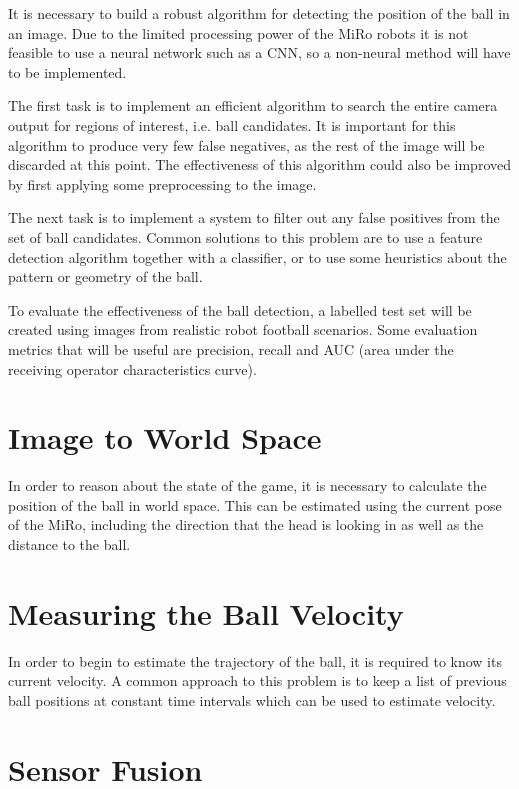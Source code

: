 It is necessary to build a robust algorithm for detecting the position of the ball in an image. Due to the limited processing power of the MiRo robots it is not feasible to use a neural network such as a CNN, so a non-neural method will have to be implemented.

The first task is to implement an efficient algorithm to search the entire camera output for regions of interest, i.e. ball candidates. It is important for this algorithm to produce very few false negatives, as the rest of the image will be discarded at this point. The effectiveness of this algorithm could also be improved by first applying some preprocessing to the image. 

The next task is to implement a system to filter out any false positives from the set of ball candidates. Common solutions to this problem are to use a feature detection algorithm together with a classifier, or to use some heuristics about the pattern or geometry of the ball. 

To evaluate the effectiveness of the ball detection, a labelled test set will be created using images from realistic robot football scenarios. Some evaluation metrics that will be useful are precision, recall and AUC (area under the receiving operator characteristics curve). 

\section{Image to World Space}

In order to reason about the state of the game, it is necessary to calculate the position of the ball in world space. This can be estimated using the current pose of the MiRo, including the direction that the head is looking in as well as the distance to the ball. 

\section{Measuring the Ball Velocity}

In order to begin to estimate the trajectory of the ball, it is required to know its current velocity. A common approach to this problem is to keep a list of previous ball positions at constant time intervals which can be used to estimate velocity.

\section{Sensor Fusion}

